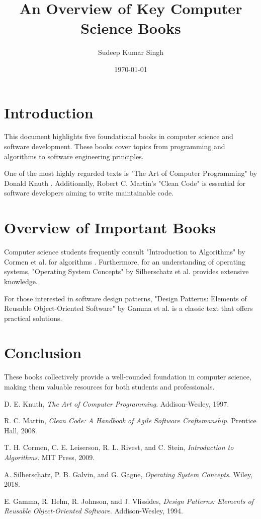 \documentclass[12pt]{article}
\title{An Overview of Key Computer Science Books}
\author{Sudeep Kumar Singh}
\date{\today}
\begin{document}
\maketitle

\section{Introduction}
This document highlights five foundational books in computer science and software development. These books cover topics from programming and algorithms to software engineering principles.

One of the most highly regarded texts is "The Art of Computer Programming" by Donald Knuth \cite{knuth1997art}. Additionally, Robert C. Martin's "Clean Code" \cite{martin2008clean} is essential for software developers aiming to write maintainable code.

\section{Overview of Important Books}
Computer science students frequently consult "Introduction to Algorithms" by Cormen et al. for algorithms \cite{cormen2009algorithms}. Furthermore, for an understanding of operating systems, "Operating System Concepts" by Silberschatz et al. \cite{silberschatz2018os} provides extensive knowledge. 

For those interested in software design patterns, "Design Patterns: Elements of Reusable Object-Oriented Software" by Gamma et al. \cite{gamma1994design} is a classic text that offers practical solutions.

\section{Conclusion}
These books collectively provide a well-rounded foundation in computer science, making them valuable resources for both students and professionals.

\begin{thebibliography}{99}

D. E. Knuth, \textit{The Art of Computer Programming}. Addison-Wesley, 1997.

R. C. Martin, \textit{Clean Code: A Handbook of Agile Software Craftsmanship}. Prentice Hall, 2008.

T. H. Cormen, C. E. Leiserson, R. L. Rivest, and C. Stein, \textit{Introduction to Algorithms}. MIT Press, 2009.

A. Silberschatz, P. B. Galvin, and G. Gagne, \textit{Operating System Concepts}. Wiley, 2018.

E. Gamma, R. Helm, R. Johnson, and J. Vlissides, \textit{Design Patterns: Elements of Reusable Object-Oriented Software}. Addison-Wesley, 1994.

\end{thebibliography}
\end{document}
